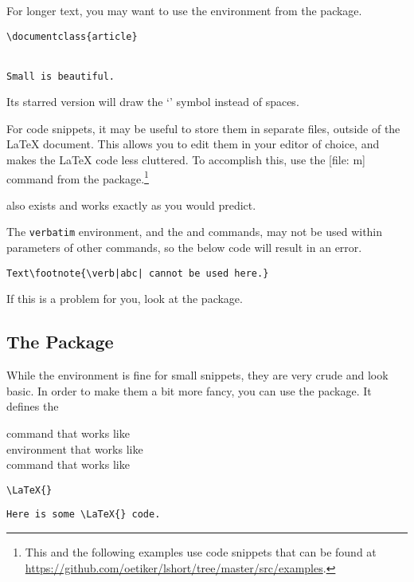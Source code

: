 For longer text, you may want to use the  environment from the
 package.
\begin{example}
\begin{verbatim}
\documentclass{article}


Small is beautiful.

\end{verbatim}
\end{example}
Its starred version will draw the \enquote*{\textvisiblespace}
symbol instead of spaces.

For code snippets, it may be useful to store them in separate files,
outside of the \LaTeX{} document. This allows you to edit them in your editor of
choice, and makes the \LaTeX{} code less cluttered. To accomplish this, use the
[file: m] command from the  package.\footnote{This
  and the following examples use code snippets that can be found at \url{https://github.com/oetiker/lshort/tree/master/src/examples}.}
\begin{example}[examplewidth=0.55\linewidth, vertical_mode]

\end{example}
 also exists and works exactly as you would predict.

The \texttt{verbatim} environment, and the  and 
commands, may not be used within parameters of other commands, so the below code
will result in an error.
\begin{verbatim}
Text\footnote{\verb|abc| cannot be used here.}
\end{verbatim}
If this is a problem for you, look at the  package.

\subsection{The  Package}

While the  environment is fine for small snippets, they are very
crude and look basic. In order to make them a bit more fancy, you can use the
 package. It defines the
\begin{lscommand}
   command that works like  \\
   environment that works like  \\
   command that works like 
\end{lscommand}
\begin{example}[examplewidth=0.6\linewidth, vertical_mode]
\lstinline|\LaTeX{}|

\begin{lstlisting}
Here is some \LaTeX{} code.
\end{lstlisting}


\end{example}


